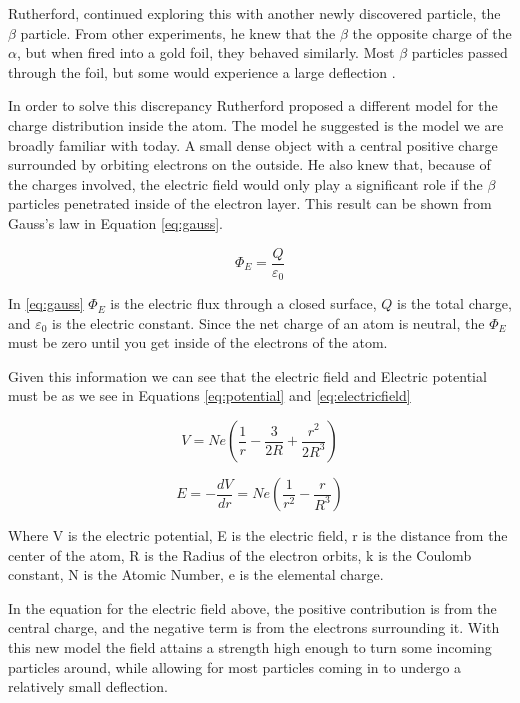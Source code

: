 \documentclass[12pt]{article}
\begin{document}
Rutherford, continued exploring this with another newly discovered particle, the $\beta$ particle.
From other experiments, he knew that the $\beta$ the opposite charge of the $\alpha$, but when fired into a gold foil, they behaved similarly.
Most $\beta$ particles passed through the foil, but some would experience a large deflection \cite{Rutherford1911}.

In order to solve this discrepancy Rutherford proposed a different model for the charge distribution inside the atom. 
The model he suggested is the model we are broadly familiar with today. A small dense object with a central positive charge surrounded by orbiting electrons on the outside.
He also knew that, because of the charges involved, the electric field would only play a significant role if the $\beta$ particles penetrated inside of the electron layer. 
This result can be shown from Gauss's law in Equation \ref{eq:gauss}.

\begin{equation}\label{eq:gauss}
    \Phi_E = \frac{Q}{\varepsilon_0}
\end{equation}

In \ref{eq:gauss} $\Phi_E$ is the electric flux through a closed surface, $Q$ is the total charge, and $\varepsilon_0$ is the electric constant.
Since the net charge of an atom is neutral, the $\Phi_E$ must be zero until you get inside of the electrons of the atom.

Given this information we can see that the electric field and Electric potential must be as we see in Equations \ref{eq:potential} and \ref{eq:electricfield}

\begin{equation}\label{eq:potential}
V = Ne(\frac{1}{r} - \frac{3}{2R} + \frac{r^2}{2R^3})
\end{equation}

\begin{equation}\label{eq:electricfield}
E = -\frac{dV}{dr} = Ne(\frac{1}{r^2} - \frac{r}{R^3})
\end{equation}

Where V is the electric potential, E is the electric field, r is the distance from the center of the atom, R is the Radius of the electron orbits, k is the Coulomb constant, N is the Atomic Number, e is the elemental charge.

In the equation for the electric field above, the positive contribution is from the central charge, and the negative term is from the electrons surrounding it.
With this new model the field attains a strength high enough to turn some incoming particles around, while allowing for most particles coming in to undergo a relatively small deflection.
\end{document}
